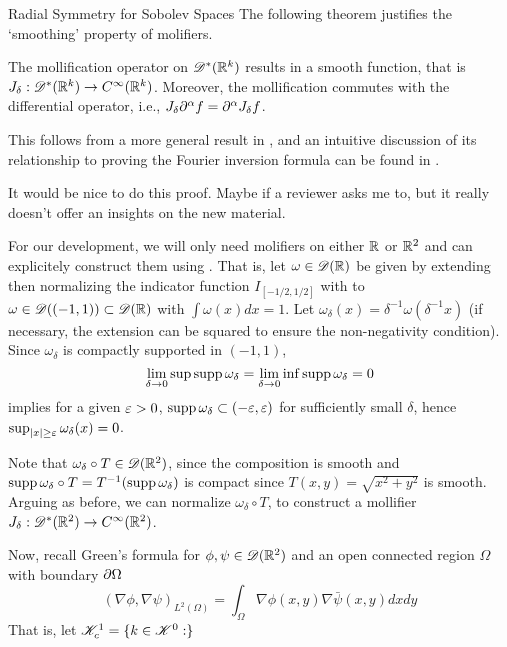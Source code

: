 \begin{chapter}{Radial Symmetry for Sobolev Spaces}
The following theorem justifies the `smoothing' property of molifiers.
\begin{thm}
  The mollification operator on $\mathscr D^*(\mathbb R^k)$ results in a smooth function, that is $J_\delta:\mathscr D^*(\mathbb R^k) \to C^\infty(\mathbb R^k)$.
  Moreover, the mollification commutes with the differential operator, i.e., $J_\delta \partial^{\alpha} f = \partial^{\alpha} J_\delta f$. 
\end{thm}
This follows from a more general result in , and an intuitive discussion of its relationship to proving the Fourier inversion formula can be found in .
\begin{com}
  It would be nice to do this proof.
  Maybe if a reviewer asks me to, but it really doesn't offer an insights on the new material.
\end{com}

For our development, we will only need molifiers on either $\mathbb R$ or $\mathbb R^2$ and can explicitely construct them using . 
That is, let $\omega \in \mathscr D(\mathbb R)$ be given by extending then normalizing the indicator function $I_{[-1/2,1/2]}$ with  to $\omega\in \mathscr D((-1,1)) \subset \mathscr D(\mathbb R)$ with $\int \omega(x) dx = 1$. 
Let $\omega_{\delta}(x) = \delta^{-1}\omega(\delta^{-1}x)$ (if necessary, the extension can be squared to ensure the non-negativity condition). 
Since $\omega_\delta$ is compactly supported in $(-1,1)$, 
\begin{equation}
  \lim_{\delta\to 0} \sup\operatorname*{supp} \omega_\delta = \lim_{\delta\to 0} \inf \operatorname*{supp} \omega_\delta = 0
\end{equation}
implies for a given $\varepsilon >0$, $\operatorname*{supp} \omega_\delta \subset (-\varepsilon,\varepsilon)$ for sufficiently small $\delta$, hence $\sup_{|x|\ge \varepsilon}\omega_\delta(x) = 0$.


Note that $\omega_\delta\circ T \in \mathscr D(\mathbb R^2)$, since the composition is smooth and $\operatorname*{supp} \omega_\delta \circ T = T^{-1}(\operatorname*{supp}\omega_\delta)$ is compact since $T(x,y) = \sqrt{x^2 + y^2}$ is smooth. 
Arguing as before, we can normalize $\omega_\delta\circ T$, to construct a mollifier $J_\delta:\mathscr D^*(\mathbb R^2)\to C^\infty(\mathbb R^2)$.

Now, recall Green's formula for $\phi,\psi \in \mathscr D(\mathbb R^2)$ and an open connected region $\Omega$ with boundary $\partial \Omega$ 
\begin{equation}
  \left(\nabla \phi, \nabla \psi\right)_{L^2(\Omega)} = \int_{\Omega} \nabla \phi(x,y) \nabla\bar\psi(x,y)dxdy
\end{equation}
That is, let $\mathscr K_c^1 = \{k\in \mathscr K^0:  \}$


\end{chapter}

